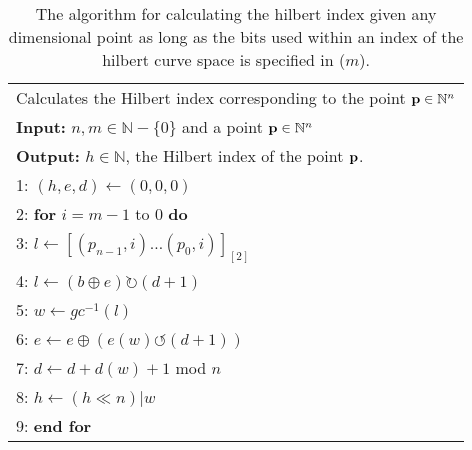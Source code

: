 \documentclass[10pt]{article}
\begin{document}
\begin{table}
  
  \begin{tabular}{l}
    \hline
    Calculates the Hilbert index corresponding to the point ${\bf p} \in \mathbb{N}^n $ \\
    {\bf Input:} $n, m \in \mathbb{N} - \{0\} $ and a point ${\bf p} \in \mathbb{N}^n$ \\
    {\bf Output:} $h \in \mathbb{N}$, the Hilbert index of the point ${\bf p}$. \\
    1: $ \left( h, e, d \right) \leftarrow \left( 0, 0, 0 \right) $ \\
    2: {\bf for} $ i = m - 1 $ to $ 0 $ { \bf do} \\
    3: \qquad $ l \leftarrow \left[ \left( p_{n-1} , i \right) \ldots \left( p_0 , i \right) \right]_{\left[ 2 \right]} $ \\
    4: \qquad $ l \leftarrow \left( b \oplus e \right) \rightturn \left( d+1 \right)$ \\
    5: \qquad $ w \leftarrow gc^{-1} \left( l \right)$ \\
    6: \qquad $ e \leftarrow e \oplus \left( e \left( w \right) \leftturn \left( d+ 1 \right) \right) $ \\
    7: \qquad $ d \leftarrow d + d \left( w \right) + 1 $ mod $n$ \\
    8: \qquad $ h \leftarrow \left( h \ll n \right) | w $ \\
    9: {\bf end for} \\
    \hline
  \end{tabular}
  \caption{The algorithm for calculating the hilbert index given any dimensional point as long as the bits used within an index of the hilbert curve space is specified in ($m$). }
  \label{hilbert-point-to-index}
\end{table}



\end{document}

